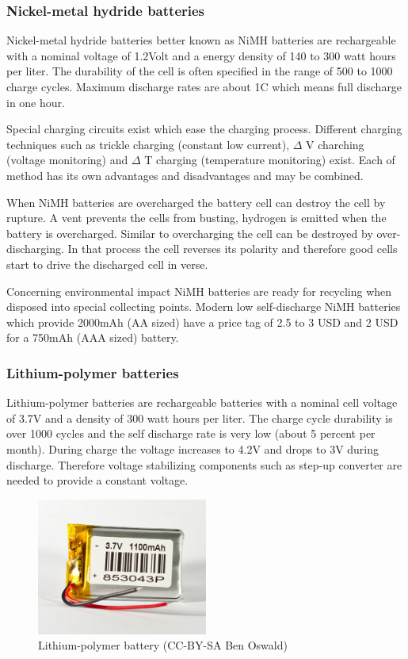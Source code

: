 \documentclass[11pt,a4paper]{article}
\begin{document}
\subsubsection{Nickel-metal hydride batteries}
Nickel-metal hydride batteries better known as NiMH batteries are rechargeable with a nominal voltage of 1.2Volt and a energy density of 140 to 300 watt hours per liter. The durability of the cell is often specified in the range of 500 to 1000 charge cycles. Maximum discharge rates are about 1C which means full discharge in one hour.

Special charging circuits exist which ease the charging process. Different charging techniques such as trickle charging (constant low current), $\Delta$ V charching (voltage monitoring) and $\Delta$ T charging (temperature monitoring) exist. Each of method has its own advantages and disadvantages and may be combined.

When NiMH batteries are overcharged the battery cell can destroy the cell by rupture. A vent prevents the cells from busting, hydrogen is emitted when the battery is overcharged. Similar to overcharging the cell can be destroyed by over-discharging. In that process the cell reverses its polarity and therefore good cells start to drive the discharged cell in verse.

Concerning environmental impact NiMH batteries are ready for recycling when disposed into special collecting points. Modern low self-discharge NiMH batteries which provide 2000mAh (AA sized) have a price tag of 2.5 to 3 USD and 2 USD for a 750mAh (AAA sized) battery. 
\subsubsection{Lithium-polymer batteries}
Lithium-polymer batteries are rechargeable batteries with a nominal cell voltage of 3.7V  and a density of 300 watt hours per liter. The charge cycle durability is over 1000 cycles and the self discharge rate is very low (about 5 percent per month). During charge the voltage increases to 4.2V and drops to 3V during discharge. Therefore voltage stabilizing components such as step-up converter are needed to provide a constant voltage.

\begin{figure}[H]
  \centering
  \includegraphics[width=0.5\textwidth]{images/30_lithium-polymer.jpg}
  \caption{Lithium-polymer battery (CC-BY-SA Ben Oswald)}
\end{figure}
\end{document}
